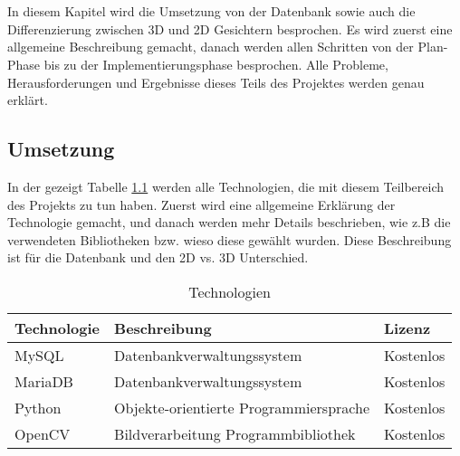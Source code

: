 \chapter{\docname}
\label{\docname}
In diesem Kapitel wird die Umsetzung von der Datenbank sowie auch die Differenzierung zwischen 3D und 2D Gesichtern besprochen. Es wird zuerst eine allgemeine Beschreibung gemacht, danach werden allen Schritten von der Plan-Phase bis zu der Implementierungsphase besprochen. Alle Probleme, Herausforderungen und Ergebnisse dieses Teils des Projektes werden genau erklärt.
\section{Umsetzung}
In der gezeigt Tabelle \ref{table:tech} werden alle Technologien, die mit diesem Teilbereich des Projekts  zu tun haben. Zuerst wird eine allgemeine Erklärung der Technologie gemacht, und danach werden mehr Details beschrieben, wie z.B die verwendeten Bibliotheken bzw. wieso diese gewählt wurden. Diese Beschreibung ist für die Datenbank und den 2D vs. 3D Unterschied.

\begin{table}[ht]
	\centering
	\begin{tabular}{ |l|l|l| } 
		\hline		
		Technologie & Beschreibung & Lizenz \\ 
		\hline
		MySQL & Datenbankverwaltungssystem & Kostenlos \\ 
		\hline
		MariaDB & Datenbankverwaltungssystem & Kostenlos \\
		\hline 
		Python & Objekte-orientierte Programmiersprache & Kostenlos \\
		\hline 
		OpenCV &  Bildverarbeitung Programmbibliothek  & Kostenlos \\ 
		\hline
	\end{tabular}
	\caption{Technologien}
	\label{table:tech}
\end{table}
